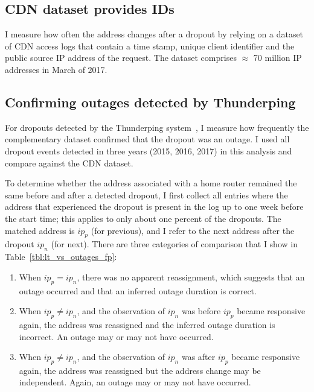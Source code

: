 \subsection{CDN dataset provides IDs}

I measure how often the address changes after a dropout by relying on a dataset of CDN access logs that contain a time stamp, unique client identifier and the public source IP address of the request.  The dataset comprises $\approx$ 70 million IP addresses in March of 2017.

\subsection{Confirming outages detected by Thunderping}

For dropouts detected by the Thunderping system~\cite{pingin}, I measure how frequently the complementary dataset confirmed that the dropout was an outage. I used all dropout events detected in three years (2015, 2016, 2017) in this analysis and compare against the CDN dataset.

To determine whether the address associated with a home router remained the same before and after a detected dropout, I
first collect all entries where the address that experienced
the dropout is present in the log up to one week before the
start time; this applies to only about one percent of the
dropouts.  The matched address is $ip_p$ (for previous), and
I refer to the next address after the dropout $ip_n$ (for
next).  There are three categories of comparison that I
show in Table~\ref{tbl:lt_vs_outages_fp}:
\begin{enumerate}
\item When $ip_p = ip_n$, there was no apparent
  reassignment, which suggests that an outage occurred and that an inferred outage duration
  is correct.
\item When $ip_p \not= ip_n$, and the observation of $ip_n$
  was before $ip_p$ became responsive again, the address was
  reassigned and the inferred outage duration is incorrect. An outage may or may not have occurred.
\item When $ip_p \not= ip_n$, and the observation of $ip_n$
  was after $ip_p$ became responsive again, the address was
  reassigned but the address change may be independent. Again, an outage may or may not have occurred.
\end{enumerate}

